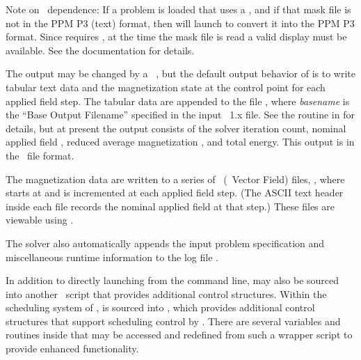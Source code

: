 Note on \Tk\ dependence: If a problem is loaded that uses a
{}, and
if that mask file is not in the PPM P3 (text) format, then
 will launch {} to convert it into
the PPM P3 format.  Since 
requires \Tk, at the
time the mask file is read a valid display must be available.  See the
 documentation for details.

The output may be changed by a \Tcl\ , but the default
output behavior of  is to write tabular text data and
the magnetization state at the control point for each applied field
step.  The tabular data are appended to the file , where {\em basename} is the
``Base Output Filename'' specified in the input
\MIF~1.x file.  See the routine  in
 for details, but at present the output consists of
the solver iteration count, nominal applied field
\vB{}, reduced average
magnetization \vm{}, and total
energy.  This output is in the \ODT\ file format.

The magnetization data are written to a series of \OVF\ (\OOMMF\ Vector
Field) files,
, where 
starts at  and is incremented at each applied
field step.  (The ASCII text header inside each
file records the nominal applied field at that step.)  These files are
viewable using .

The solver also automatically appends the input problem specification
and miscellaneous runtime information to the log file
.


\label{sec:batchsolvepi}
In addition to directly launching  from the command
line,   may also be sourced into another \Tcl\ script
that provides additional control structures.  Within the scheduling
system of \OBS,
 is sourced into , which provides
additional control structures that support scheduling control by
.
There are several variables and routines
inside  that may be accessed and redefined from such
a wrapper script to provide enhanced functionality.

